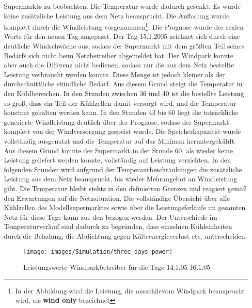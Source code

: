 Supermarkts zu beobachten. Die Temperatur wurde dadurch gesenkt. Es wurde keine
zus\"atzliche Leistung aus dem Netz beansprucht. Die Aufladung wurde komplett
durch die Windleistung vorgenommen\footnote{ In der Abbildung wird die
Leistung, die ausschlie\sslich vom Windpark beansprucht wird, als \textbf{wind only}
bezeichnet}. Die Prognose wurde der realen Werte f\"ur den neuen Tag angepasst.
Der Tag 15.1.2005 zeichnet sich durch eine deutliche Windschw\"ache aus, sodass
der Supermarkt mit dem gr\"o\ss ten Teil seines Bedarfs sich nicht beim
Netzbetreiber abgemeldet hat. Der Windpark konnte aber auch die Differenz nicht
bedienen, sodass nur die aus dem Netz bestellte Leistung verbraucht werden
konnte. Diese Menge ist jedoch kleiner als der durchschnittliche st\"undliche
Bedarf. Aus diesem Grund steigt die Temperatur in den K\"uhlbereichen. In den
Stunden zwischen 36 und 40 ist die bestellte Leistung so gro\ss ,$ $ dass ein
Teil der K\"uhlzellen damit versorgt wird, und die Temperatur konstant gehalten
werden kann. In den Stunden 43 bis 60 liegt die tats\"achliche generierte
Windleistung deutlich \"uber der Prognose, sodass der Supermarkt komplett von
der Windversorgung gespeist wurde. Die Speicherkapazit\"at wurde vollst\"andig
ausgenutzt und die Temperatur auf das Minimun heruntergek\"uhlt. Aus diesem
Grund konnte der Supermarkt in der Stunde 60, als wieder keine Leistung
geliefert werden konnte, vollst\"andig auf Leistung verzichten. In den folgenden
Stunden wird aufgrund der Temperaurbeschr\"ankungen die zus\"atzliche Leistung
aus dem Netz beansprucht, bis wieder Mehrangebot an Windleistung gibt. Die
Temperatur bleibt stehts in den definierten Grenzen und reagiert gem\"a\ss $ $
den Erwartungen auf die Netzsituation. Die vollst\"andige \"Ubersicht \"uber
alle K\"uhlzellen des Modellsupermarktes sowie \"uber die Leistungsferl\"aufe im
gesamten Netz f\"ur diese Tage kann aus den 
bezogen werden. Der Unterschiede im Temperaturverlauf sind dadurch zu
begr\"unden, dass einzelnen K\"uhleinheiten durch die Beladung, die Abdichtung
gegen K\"alteenergieverlust etc. unterscheiden.

\begin{figure}[h] \begin{center}
\texttt{[image: images/Simulation/three\_days\_power]} \end{center}
\vspace{-25pt} \caption{Leistungswerte Windparkbetreiber f\"ur die Tage
14.1.05-16.1.05} \label{fig:threep} \end{figure}

